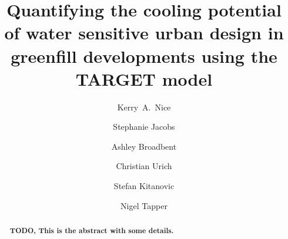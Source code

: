 \documentclass[final,3p,times,authoryear]{elsarticle}
\begin{document}
 


\begin{frontmatter}



\title{Quantifying the cooling potential of water sensitive urban design in greenfill developments using the TARGET model}




\author[melb,monash,crc]{Kerry~A.~Nice}
\author[monash,crc,Mosiac]{Stephanie Jacobs}
\author[az1,az2,monash,crc]{Ashley Broadbent}
\author[monasheng]{Christian Urich}
\author[monasheng]{Stefan Kitanovic}
\author[monash,crc]{Nigel Tapper}



\address[melb]{Transport, Health, and Urban Design Hub, Faculty of Architecture, Building, and Planning, University of Melbourne, Victoria 3010, Australia}
\address[monash]{School of Earth, Atmosphere and Environment, Monash University, Clayton, VIC 3800, Australia}
\address[az1]{School of Geographical Sciences and Urban Planning, Arizona State University, Tempe, Arizona, USA}
\address[az2]{Urban Climate Research Center, Arizona State University, Tempe, Arizona, USA}
\address[crc]{Cooperative Research Centre for Water Sensitive Cities, Melbourne, Australia}
\address[Mosiac]{Mosiac Insights, Melbourne, Australia}
\address[monasheng]{Department of Civil Engineering, Monash University, Clayton, VIC 3800, Australia}




\begin{abstract}

\textbf{TODO, This is the abstract with some details.}


\end{abstract}
\end{frontmatter}
\end{document}
